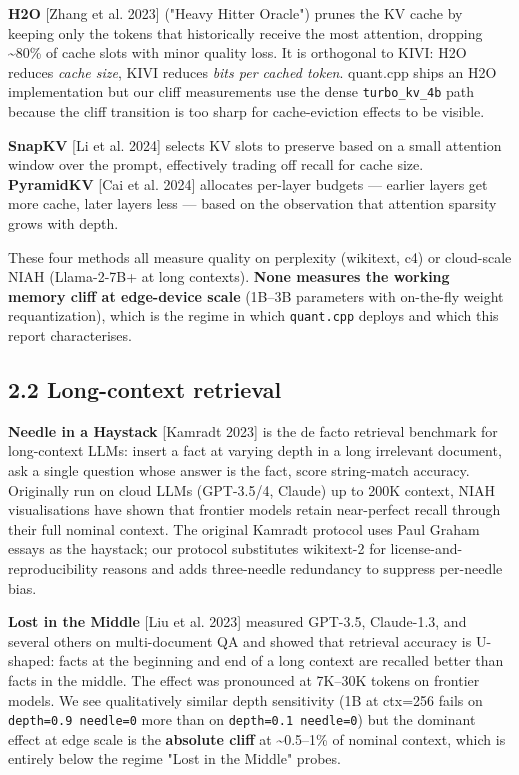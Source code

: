 \documentclass[11pt]{article}
\begin{document}
\textbf{H2O} [Zhang et al. 2023] ("Heavy Hitter Oracle") prunes the KV cache by keeping only the tokens that historically receive the most attention, dropping \textasciitilde{}80\% of cache slots with minor quality loss. It is orthogonal to KIVI: H2O reduces \textit{cache size}, KIVI reduces \textit{bits per cached token}. quant.cpp ships an H2O implementation but our cliff measurements use the dense \texttt{turbo\_kv\_4b} path because the cliff transition is too sharp for cache-eviction effects to be visible.


\textbf{SnapKV} [Li et al. 2024] selects KV slots to preserve based on a small attention window over the prompt, effectively trading off recall for cache size. \textbf{PyramidKV} [Cai et al. 2024] allocates per-layer budgets — earlier layers get more cache, later layers less — based on the observation that attention sparsity grows with depth.


These four methods all measure quality on perplexity (wikitext, c4) or cloud-scale NIAH (Llama-2-7B+ at long contexts). \textbf{None measures the working memory cliff at edge-device scale} (1B–3B parameters with on-the-fly weight requantization), which is the regime in which \texttt{quant.cpp} deploys and which this report characterises.


\subsection*{2.2 Long-context retrieval}


\textbf{Needle in a Haystack} [Kamradt 2023] is the de facto retrieval benchmark for long-context LLMs: insert a fact at varying depth in a long irrelevant document, ask a single question whose answer is the fact, score string-match accuracy. Originally run on cloud LLMs (GPT-3.5/4, Claude) up to 200K context, NIAH visualisations have shown that frontier models retain near-perfect recall through their full nominal context. The original Kamradt protocol uses Paul Graham essays as the haystack; our protocol substitutes wikitext-2 for license-and-reproducibility reasons and adds three-needle redundancy to suppress per-needle bias.


\textbf{Lost in the Middle} [Liu et al. 2023] measured GPT-3.5, Claude-1.3, and several others on multi-document QA and showed that retrieval accuracy is U-shaped: facts at the beginning and end of a long context are recalled better than facts in the middle. The effect was pronounced at 7K–30K tokens on frontier models. We see qualitatively similar depth sensitivity (1B at ctx=256 fails on \texttt{depth=0.9 needle=0} more than on \texttt{depth=0.1 needle=0}) but the dominant effect at edge scale is the \textbf{absolute cliff} at \textasciitilde{}0.5–1\% of nominal context, which is entirely below the regime "Lost in the Middle" probes.
\end{document}
